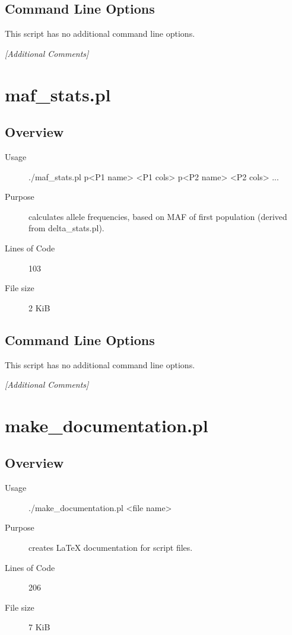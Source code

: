 \subsection{Command Line Options}
\label{sec:linecount.pl-command-line}

This script has no additional command line options.

\emph{[Additional Comments]}

\section{maf_stats.pl}
\label{sec:maf-stats.pl}

\subsection{Overview}
\label{sec:maf-stats.pl-overview}

\begin{description}
\item[Usage] ./maf_stats.pl p<P1 name> <P1 cols> p<P2 name> <P2 cols> ...
\item[Purpose] calculates allele frequencies, based on MAF of first population (derived from delta_stats.pl).
\item[Lines of Code] 103
\item[File size] 2 KiB
\end{description}

\subsection{Command Line Options}
\label{sec:maf-stats.pl-command-line}

This script has no additional command line options.

\emph{[Additional Comments]}

\section{make_documentation.pl}
\label{sec:make-documentation.pl}

\subsection{Overview}
\label{sec:make-documentation.pl-overview}

\begin{description}
\item[Usage] ./make_documentation.pl <file name>
\item[Purpose] creates LaTeX documentation for script files.
\item[Lines of Code] 206
\item[File size] 7 KiB
\end{description}

